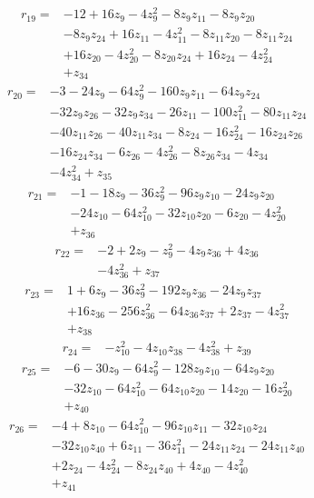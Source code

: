 \begin{align*}
r_{19}={}&-12 +16z_{9} -4z_{9}^{2} -8z_{9}z_{11} -8z_{9}z_{20}\\
&-8z_{9}z_{24} +16z_{11} -4z_{11}^{2} -8z_{11}z_{20} -8z_{11}z_{24}\\
&+16z_{20} -4z_{20}^{2} -8z_{20}z_{24} +16z_{24} -4z_{24}^{2}\\
&+z_{34}
\end{align*}
\begin{align*}
r_{20}={}&-3 -24z_{9} -64z_{9}^{2} -160z_{9}z_{11} -64z_{9}z_{24}\\
&-32z_{9}z_{26} -32z_{9}z_{34} -26z_{11} -100z_{11}^{2} -80z_{11}z_{24}\\
&-40z_{11}z_{26} -40z_{11}z_{34} -8z_{24} -16z_{24}^{2} -16z_{24}z_{26}\\
&-16z_{24}z_{34} -6z_{26} -4z_{26}^{2} -8z_{26}z_{34} -4z_{34}\\
&-4z_{34}^{2} +z_{35}
\end{align*}
\begin{align*}
r_{21}={}&-1 -18z_{9} -36z_{9}^{2} -96z_{9}z_{10} -24z_{9}z_{20}\\
&-24z_{10} -64z_{10}^{2} -32z_{10}z_{20} -6z_{20} -4z_{20}^{2}\\
&+z_{36}
\end{align*}
\begin{align*}
r_{22}={}&-2 +2z_{9} -z_{9}^{2} -4z_{9}z_{36} +4z_{36}\\
&-4z_{36}^{2} +z_{37}
\end{align*}
\begin{align*}
r_{23}={}&1 +6z_{9} -36z_{9}^{2} -192z_{9}z_{36} -24z_{9}z_{37}\\
&+16z_{36} -256z_{36}^{2} -64z_{36}z_{37} +2z_{37} -4z_{37}^{2}\\
&+z_{38}
\end{align*}
\begin{align*}
r_{24}={}&-z_{10}^{2} -4z_{10}z_{38} -4z_{38}^{2} +z_{39}
\end{align*}
\begin{align*}
r_{25}={}&-6 -30z_{9} -64z_{9}^{2} -128z_{9}z_{10} -64z_{9}z_{20}\\
&-32z_{10} -64z_{10}^{2} -64z_{10}z_{20} -14z_{20} -16z_{20}^{2}\\
&+z_{40}
\end{align*}
\begin{align*}
r_{26}={}&-4 +8z_{10} -64z_{10}^{2} -96z_{10}z_{11} -32z_{10}z_{24}\\
&-32z_{10}z_{40} +6z_{11} -36z_{11}^{2} -24z_{11}z_{24} -24z_{11}z_{40}\\
&+2z_{24} -4z_{24}^{2} -8z_{24}z_{40} +4z_{40} -4z_{40}^{2}\\
&+z_{41}
\end{align*}
